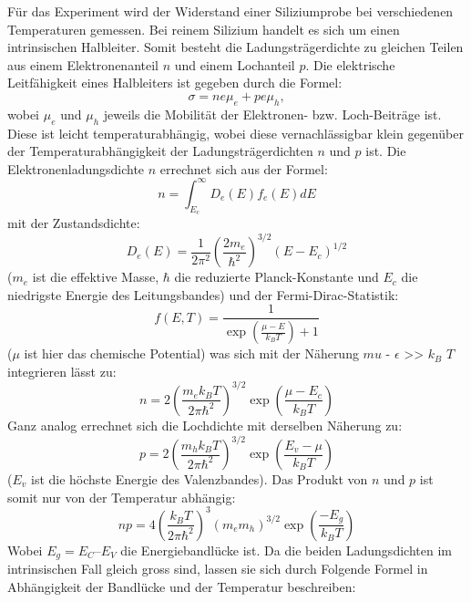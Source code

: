 \documentclass[a4paper]{scrartcl}
\begin{document}
Für das Experiment wird der Widerstand einer Siliziumprobe bei verschiedenen Temperaturen gemessen. Bei reinem Silizium handelt es sich um einen intrinsischen Halbleiter. Somit besteht die Ladungsträgerdichte zu gleichen Teilen aus einem Elektronenanteil $n$ und einem Lochanteil $p$.
Die elektrische Leitfähigkeit eines Halbleiters ist gegeben durch die Formel:
\begin{equation}
\label{eq:sigma}
\sigma = ne\mu_e + pe\mu_h,
\end{equation}
wobei $\mu_e$ und $\mu_h$ jeweils die Mobilität der Elektronen- bzw. Loch-Beiträge ist. Diese ist leicht temperaturabhängig, wobei diese vernachlässigbar klein gegenüber der Temperaturabhängigkeit der Ladungsträgerdichten $n$ und $p$ ist.
Die Elektronenladungsdichte $n$ errechnet sich aus der Formel: 
\begin{equation}
n = \int_{E_c}^{\infty} D_e(E) f_e(E) dE
\end{equation}
mit der Zustandsdichte:
\begin{equation}
D_e(E) = \frac{1}{2 \pi^2} \left(\frac{2 m_e}{\hbar^2}\right)^{3/2} (E - E_c)^{1/2}
\end{equation}
($m_e$ ist die effektive Masse, $\hbar$ die reduzierte Planck-Konstante und $E_c$ die niedrigste Energie des Leitungsbandes) und der Fermi-Dirac-Statistik:
\begin{equation}
f(E,T) = \frac{1}{\exp \left(\frac{\mu - E}{k_B T}\right) + 1}
\end{equation}
($\mu$ ist hier das chemische Potential) was sich mit der Näherung $mu$ - $\epsilon$ >> $k_B$ $T$ integrieren lässt zu:
\begin{equation}
n = 2 \left(\frac{m_e k_B T}{2 \pi \hbar^2}\right)^{3/2} \exp \left(\frac{\mu - E_c}{k_B T}\right)
\end{equation}
Ganz analog errechnet sich die Lochdichte mit derselben Näherung zu:
\begin{equation}
p = 2 \left(\frac{m_h k_B T}{2 \pi \hbar^2}\right)^{3/2} \exp \left(\frac{E_v - \mu}{k_B T}\right)
\end{equation}
($E_v$ ist die höchste Energie des Valenzbandes). Das Produkt von $n$ und $p$ ist somit nur von der Temperatur abhängig:
\begin{equation}
np = 4 \left(\frac{k_B T}{2 \pi \hbar^2}\right)^{3} (m_e m_h)^{3/2} \exp \left(\frac{-E_g}{k_B T}\right)
\end{equation}
Wobei $E_g = E_C – E_V$ die Energiebandlücke ist. Da die beiden Ladungsdichten im intrinsischen Fall gleich gross sind, lassen sie sich durch Folgende Formel in Abhängigkeit der Bandlücke und der Temperatur beschreiben:
\end{document}
